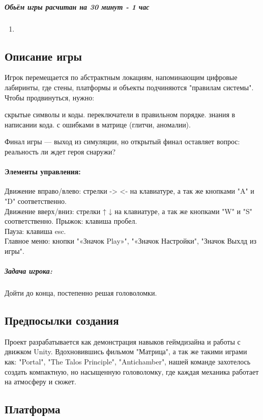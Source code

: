 \documentclass{article}
\begin{document}
\subparagraph{Обьём игры расчитан на 30 минут - 1 час}
\begin{enumerate}
    \item 
\end{enumerate}

\subsection{Описание игры}
Игрок перемещается по абстрактным локациям, напоминающим цифровые лабиринты, где стены, платформы и объекты подчиняются "правилам системы". Чтобы продвинуться, нужно:
\begin{enumerate}
 скрытые символы и коды.
 переключатели в правильном порядке.
 знания в написании кода.
 с ошибками в матрице (глитчи, аномалии).
\end{enumerate}
Финал игры — выход из симуляции, но открытый финал оставляет вопрос: реальность ли ждет героя снаружи?
\paragraph{Элементы управления:}
Движение вправо/влево: стрелки -> <- на клавиатуре, а так же кнопками "A" и "D" соответственно.\\
Движение вверх/вниз: стрелки ↑ ↓ на клавиатуре, а так же кнопками "W" и "S" соответственно.
  Прыжок: клавиша пробел.\\
    Пауза: клавиша esc.\\
      Главное меню: кнопки "«Значок Play»", "«Значок Настройки", "Значок Выхлд из игры".

\subparagraph{Задача игрока:} Дойти до конца, постепенно решая головоломки.

\subsection{Предпосылки создания}
Проект разрабатывается как демонстрация навыков геймдизайна и работы с движком Unity. Вдохновившись фильмом "Матрица", а так же такими играми как:  "Portal", "The Talos Principle", "Antichamber", нашей команде захотелось создать компактную, но насыщенную головоломку, где каждая механика работает на атмосферу и сюжет.

\subsection{Платформа}
\end{document}
